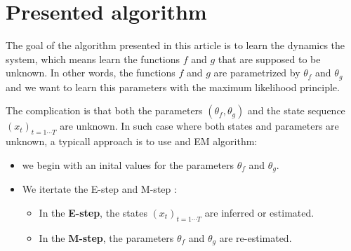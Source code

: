 \section{Presented algorithm}

The goal of the algorithm presented in this article is to learn the dynamics the system, which means learn the functions $f$ and $g$ that are supposed to be unknown.
In other words, the functions $f$ and $g$ are parametrized by $\theta_f$ and $\theta_g$ and we want to learn this parameters with the maximum likelihood principle.

The complication is that both the parameters $(\theta_f, \theta_g)$ and the state sequence $(x_t)_{t=1 \cdots T}$ are unknown.
In such case where both states and parameters are unknown, a typicall approach is to use and EM algorithm:
\begin{itemize}
\item we begin with an inital values for the parameters $\theta_f$ and $\theta_g$.
\item We itertate the E-step and M-step :
  \begin{itemize}
  \item In the \textbf{E-step}, the states $(x_t)_{t=1 \cdots T}$ are inferred or estimated.
  \item In the \textbf{M-step}, the parameters $\theta_f$ and $\theta_g$ are re-estimated.
  \end{itemize}
\end{itemize}
